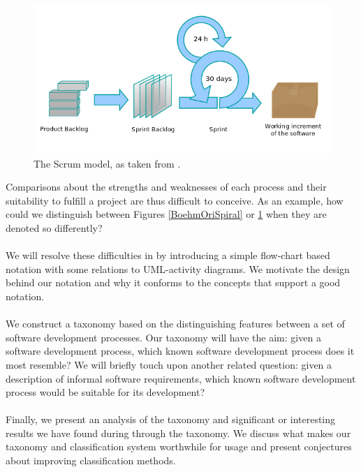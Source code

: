 \begin{figure}[ht!]
  \centering
  \includegraphics[scale=0.4]{media/Scrum_process}
  \caption{The Scrum model, as taken from \cite{SCRUMPIC}.}
  \label{ScrumRandomPic}
\end{figure}

\pagebreak

Comparisons about the strengths and weaknesses of each process and their suitability to fulfill a
project are thus difficult to conceive.
As an example, how could we distinguish between Figures \ref{BoehmOriSpiral} or
\ref{ScrumRandomPic} when they are denoted so differently?\\
\\
We will resolve these difficulties in by introducing a simple flow-chart based notation with some
relations to UML-activity diagrams.
We motivate the design behind our notation and why it conforms to the concepts that support a good
notation.\\
\\
We construct a taxonomy based on the distinguishing features between a set of software development
processes.
Our taxonomy will have the aim: given a software development process, which known software development process does it most
	resemble?
We will briefly touch upon another related question: given a description of informal software requirements, which known software development
	process would be suitable for its development?\\
\\
Finally, we present an analysis of the taxonomy and significant or interesting results we have
found during through the taxonomy.
We discuss what makes our taxonomy and classification system worthwhile for usage and present
conjectures about improving classification methods.
